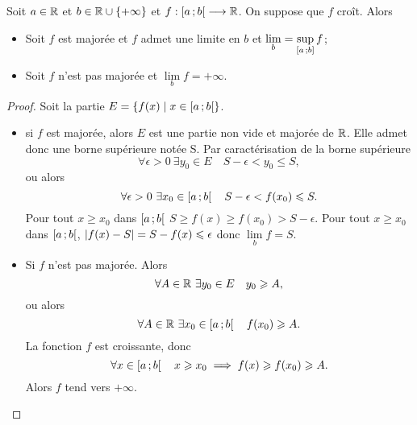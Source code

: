 \begin{theo}
  Soit \(a \in \mathbb{R}\) et \(b \in \mathbb{R}\cup\{+\infty\}\) et \(f : \left[ a \, ; {} b \right[ 
  \longrightarrow \mathbb{R}\). On suppose que \(f\) croît. Alors
  \begin{itemize}
    \item Soit \(f\) est majorée et \(f\) admet une limite en \(b\) et 
      \(\lim\limits_{b} = \sup\limits_{\left[ a \, ; {} b \right]}f\);
    \item Soit \(f\) n'est pas majorée et \(\lim\limits_{b}f=+\infty\).
  \end{itemize}
\end{theo}
\begin{proof}
  Soit la partie \(E=\left\{f(x)\mathrel{}\middle|\mathrel{}x \in \left[ a \, ; {} b \right[\right\}\).
  \begin{itemize}
    \item si \(f\) est majorée, alors \(E\) est une partie non vide et majorée 
      de \(\mathbb{R}\). Elle admet donc une borne supérieure notée S. Par 
      caractérisation de la borne supérieure
      \begin{equation}
        \forall \epsilon >0 \ \exists y_0 \in E \quad S-\epsilon <y_0 \leqslant 
        S,
      \end{equation}
      ou alors
      \begin{equation}
        \forall \epsilon >0 \ \exists x_0 \in \left[ a \, ; {} b \right[ \quad 
        S-\epsilon <f(x_0) \leqslant S.
      \end{equation}
      Pour tout \(x \geqslant x_0\) dans \(\left[ a \, ; {} b \right[\) \(S \geqslant 
      f(x) \geqslant f(x_0) > S-\epsilon\). Pour tout \(x \geqslant x_0\) dans 
      \(\left[ a \, ; {} b \right[\), \(\left\lvert f(x)-S\right\rvert=S-f(x) \leqslant \epsilon\) donc 
      \(\lim\limits_{b} f =S\).
    \item Si \(f\) n'est pas majorée. Alors
      \begin{equation}
        \forall A \in \R \ \exists y_0 \in E \quad y_0 \geqslant A,
      \end{equation}
      ou alors
      \begin{equation}
        \forall A \in \mathbb{R} \ \exists x_0 \in \left[ a \, ; {} b \right[ \quad f(x_0) 
        \geqslant A.
      \end{equation}
      La fonction \(f\) est croissante, donc
      \begin{equation}
        \forall x \in \left[ a \, ; {} b \right[ \quad x \geqslant x_0 \implies f(x) 
        \geqslant f(x_0) \geqslant A.
      \end{equation}
      Alors \(f\) tend vers \(+\infty\).
  \end{itemize}
\end{proof}

